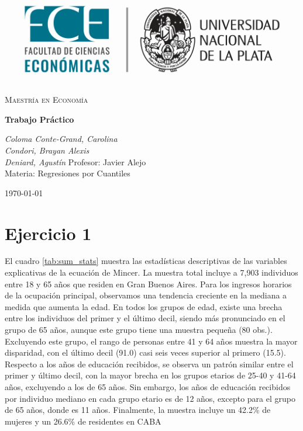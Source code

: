 \documentclass[11pt]{article}
\begin{document}
   


\begin{titlepage}
    \centering
    \vspace*{2cm}
    \includegraphics[width=1\textwidth]{logo.png} 
    
    \vspace{2cm}
    {\scshape\LARGE Maestría en Economía} \\
    
    \vspace{0.5cm}
    {\huge\bfseries
    Trabajo Práctico\par}
    \vspace{2cm}
    {\Large\itshape Coloma Conte-Grand, Carolina} \\
    
    {\Large\itshape Condori, Brayan Alexis} \\
    
    {\Large\itshape Deniard, Agustín}
    \vfill
    {\Large Profesor: Javier Alejo} \\
    \vspace{0.5cm}
    {\Large Materia: Regresiones por Cuantiles}

    \vfill

    {\large \today\par}
\end{titlepage}

\justify 

\section*{Ejercicio 1}


El cuadro \ref{tab:sum_stats} muestra las estadísticas descriptivas de las variables explicativas de la ecuación de Mincer. La muestra total incluye a 7,903 individuos entre 18 y 65 años que residen en Gran Buenos Aires. Para los ingresos horarios de la ocupación principal, observamos una tendencia creciente en la mediana a medida que aumenta la edad. En todos los grupos de edad, existe una brecha entre los individuos del primer y el último decil, siendo más pronunciado en el grupo de 65 años, aunque este grupo tiene una muestra pequeña (80 obs.). Excluyendo este grupo, el rango de personas entre 41 y 64 años muestra la mayor disparidad, con el último decil (91.0) casi seis veces superior al primero (15.5). Respecto a los años de educación recibidos, se observa un patrón similar entre el primer y último decil, con la mayor brecha en los grupos etarios de 25-40 y 41-64 años, excluyendo a los de 65 años. Sin embargo, los años de educación recibidos por individuo mediano en cada grupo etario es de 12 años, excepto para el grupo de 65 años, donde es 11 años. Finalmente, la muestra incluye un 42.2\% de mujeres y un 26.6\% de residentes en CABA
\end{document}
